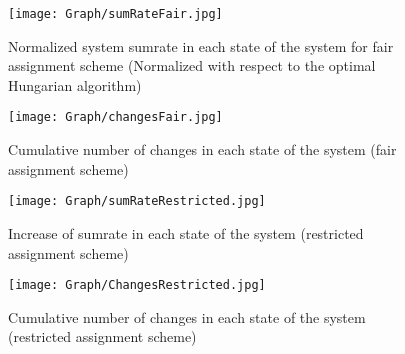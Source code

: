 \documentclass[times]{dacauth}
\begin{document}

\begin{figure}[t]
	{ %
		\setlength{\fboxsep}{1.5pt}%
		\setlength{\fboxrule}{1.5pt}%
		\centering
		\texttt{[image: Graph/sumRateFair.jpg]}
		\caption{Normalized system sumrate in each state of the system for fair assignment scheme (Normalized with respect to the optimal Hungarian algorithm)} \label{fig:sum_f}
	}
\end{figure}

\begin{figure}[t]
	{ %
	    \vspace{-.5cm}
		\setlength{\fboxsep}{1.5pt}%
		\setlength{\fboxrule}{1.5pt}%
		\centering
		\texttt{[image: Graph/changesFair.jpg]}
		\caption{Cumulative number of changes in each state of the system (fair assignment scheme)}
		\vspace{-.5cm}
		\label{fig:noc_f}
		
	}
\end{figure}


\begin{figure}[t]
	{ %
		\setlength{\fboxsep}{1.5pt}%
		\setlength{\fboxrule}{1.5pt}%
		\centering
		\texttt{[image: Graph/sumRateRestricted.jpg]}
		\caption{Increase of sumrate in each state of the system (restricted assignment scheme)}
		\vspace{-.5cm}
		\label{fig:sum_uf}
	}
\end{figure}

\begin{figure}[t]
	{ %
		\setlength{\fboxsep}{1.5pt}%
		\setlength{\fboxrule}{1.5pt}%
		\centering
		\texttt{[image: Graph/ChangesRestricted.jpg]}
		\caption{Cumulative number of changes in each state of the system (restricted assignment scheme)} \label{fig:noc_uf}
		\vspace{-.5cm}
	}
\end{figure}
\end{document}
